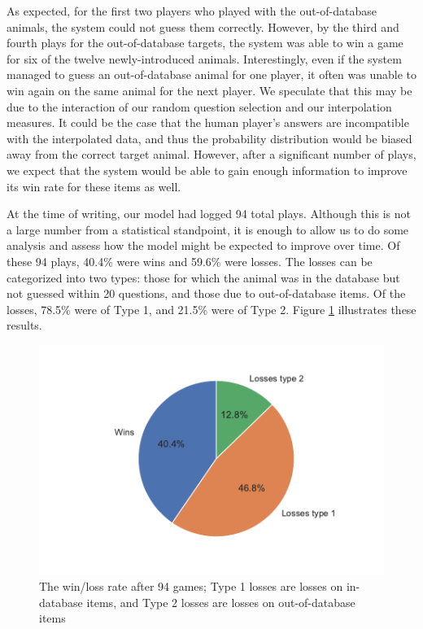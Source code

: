 \documentclass[11pt,a4paper]{article}
\begin{document}
As expected, for the first two players who played with the out-of-database animals, the system could not guess them correctly.
However, by the third and fourth plays for the out-of-database targets, the system was able to win a game for six of the twelve newly-introduced animals.
Interestingly, even if the system managed to guess an out-of-database animal for one player, it often was unable to win again on the same animal for the next player.
We speculate that this may be due to the interaction of our random question selection and our interpolation measures. 
It could be the case that the human player's answers are incompatible with the interpolated data, and thus the probability distribution would be biased away from the correct target animal. 
However, after a significant number of plays, we expect that the system would be able to gain enough information to improve its win rate for these items as well.

\pagebreak

At the time of writing, our model had logged 94 total plays. 
Although this is not a large number from a statistical standpoint, it is enough to allow us to do some analysis and assess how the model might be expected to improve over time. 
Of these 94 plays, 40.4\% were wins and 59.6\% were losses. 
The losses can be categorized into two types: those for which the animal was in the database but not guessed within 20 questions, and those due to out-of-database items. 
Of the losses, 78.5\% were of Type 1, and 21.5\% were of Type 2. 
Figure \ref{fig:wins-losses} illustrates these results. 

\begin{figure}
    \centering
    \includegraphics[width=\linewidth]{graphics/pie_detailed-winsLosses.pdf}
    \caption{The win/loss rate after 94 games; Type 1 losses are losses on in-database items, and Type 2 losses are losses on out-of-database items}
    \label{fig:wins-losses}
\end{figure}
\end{document}
